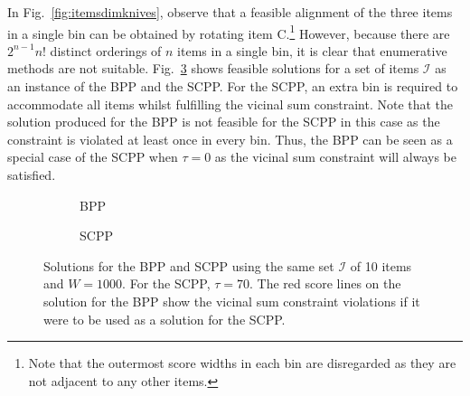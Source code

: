 \documentclass[a4paper,11pt,authoryear]{elsarticle}
\begin{document}
In Fig.~\ref{fig:itemsdimknives}, observe that a feasible alignment of the three items in a single bin can be obtained by rotating item C.\footnote{Note that the outermost score widths in each bin are disregarded as they are not adjacent to any other items.} However, because there are $2^{n-1} n!$ distinct orderings of $n$ items in a single bin, it is clear that enumerative methods are not suitable. Fig.~\ref{fig:bppvscpp} shows feasible solutions for a set of items $\mathcal{I}$ as an instance of the BPP and the SCPP. For the SCPP, an extra bin is required to accommodate all items whilst fulfilling the vicinal sum constraint. Note that the solution produced for the BPP is not feasible for the SCPP in this case as the constraint is violated at least once in every bin. Thus, the BPP can be seen as a special case of the SCPP when $\tau=0$ as the vicinal sum constraint will always be satisfied.

\begin{figure}[H]
	\centering	
	\begin{subfigure}[h]{0.42\textwidth}
		
		\caption{BPP}
		\label{fig:bpp}
	\end{subfigure} \hspace{10mm}
	\begin{subfigure}[h]{0.42\textwidth}
		
		\caption{SCPP}
		\label{fig:scpp}
	\end{subfigure}
	\caption{Solutions for the BPP and SCPP using the same set $\mathcal{I}$ of 10 items and $W = 1000$. For the SCPP, $\tau = 70$. The red score lines on the solution for the BPP show the vicinal sum constraint violations if it were to be used as a solution for the SCPP.}	
	\label{fig:bppvscpp}
\end{figure}
\end{document}

